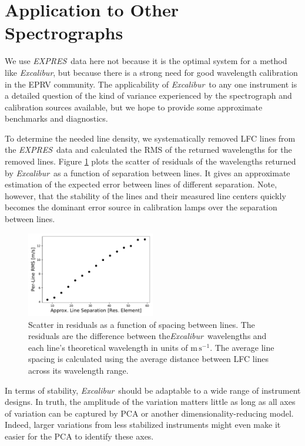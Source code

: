 \documentclass[modern]{aastex63}
\newcommand{\project}[1]{\textsl{#1}}
\newcommand{\name}{\project{Excalibur}}
\newcommand{\acronym}[1]{{\small{#1}}}
\newcommand{\expres}{\project{\acronym{EXPRES}}}
\newcommand{\mps}{\mathrm{m\,s^{-1}}}
\begin{document}
\section{Application to Other Spectrographs}
\label{sec:others}
We use \expres\ data here not because it is the optimal system for a method like \name, but because there is a strong need for good wavelength calibration in the EPRV community.  The applicability of \name\ to any one instrument is a detailed question of the kind of variance experienced by the spectrograph and calibration sources available, but we hope to provide some approximate benchmarks and diagnostics.

To determine the needed line density, we systematically removed LFC lines from the \expres\ data and calculated the RMS of the returned wavelengths for the removed lines.  Figure \ref{fig:density} plots the scatter of residuals of the wavelengths returned by \name\ as a function of separation between lines.  It gives an approximate estimation of the expected error between lines of different separation.  Note, however, that the stability of the lines and their measured line centers quickly becomes the dominant error source in calibration lamps over the separation between lines.

\begin{figure}[h]
\centering
\includegraphics[width=0.5\textwidth]{Figures/lfcDensityTest.pdf}
\caption{Scatter in residuals as a function of spacing between lines.  The residuals are the difference between the\name\ wavelengths and each line's theoretical wavelength in units of $\mps$.  The average line spacing is calculated using the average distance between LFC lines across its wavelength range.}
\label{fig:density}
\end{figure} 

In terms of stability, \name\ should be adaptable to a wide range of instrument designs.  In truth, the amplitude of the variation matters little as long as all axes of variation can be captured by PCA or another dimensionality-reducing model.  Indeed, larger variations from less stabilized instruments might even make it easier for the PCA to identify these axes.
\end{document}
